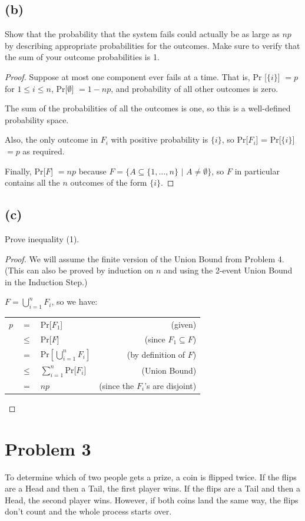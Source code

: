 \documentclass[14pt]{extarticle}
\newcommand{\dps}{\displaystyle}
\begin{document}
\subsection{(b)}
Show that the probability that the system fails could actually be as large as $np$ by describing appropriate probabilities for the outcomes. Make sure to verify that the sum of your outcome probabilities is 1.
\begin{proof}
Suppose at most one component ever fails at a time. That is, Pr [$\{i\}$] $= p$ for $1 \leq i \leq n$, Pr[$\emptyset$] $= 1 - np$, and probability of all other outcomes is zero. 

The sum of the probabilities of all the outcomes is one, so this is a well-defined probability space. 

Also, the only outcome in $F_i$ with positive probability is $\{i\}$, so Pr[$F_i$] = Pr[$\{i\}$] $= p$ as required. 

Finally, Pr[$F$] $= np$ because $F = \{A \subseteq \{1, \ldots, n\} \,\,|\,\, A \neq \emptyset\}$, so $F$ in particular contains all the $n$ outcomes of the form $\{i\}$.
\end{proof}

\subsection{(c)}
Prove inequality (1).

\begin{proof}
We will assume the finite version of the Union Bound from Problem 4. (This can also be proved by induction on $n$ and using the 2-event Union Bound in the Induction Step.)

$\dps F = \bigcup_{i=1}^n F_i$, so we have:

\begin{tabular}{rclr}
$p$ & = & Pr[$F_1$] & (given)\\
& $\leq$ & Pr[$F$] & (since $F_1 \subseteq F$)\\
& = & Pr$\left[\dps\bigcup_{i=1}^n F_i\right]$ & (by definition of $F$)\\
& $\leq$ & $\dps\sum_{i = 1}^{n}$Pr[$F_i$]& (Union Bound) \\
& = & $np$ & (since the $F_i$'s are disjoint)
\end{tabular}
\end{proof}

\section{Problem 3}
To determine which of two people gets a prize, a coin is flipped twice. If the flips are a Head and then a Tail, the first player wins. If the flips are a Tail and then a Head, the second player wins. However, if both coins land the same way, the flips don’t count and the whole process starts over.
\end{document}
